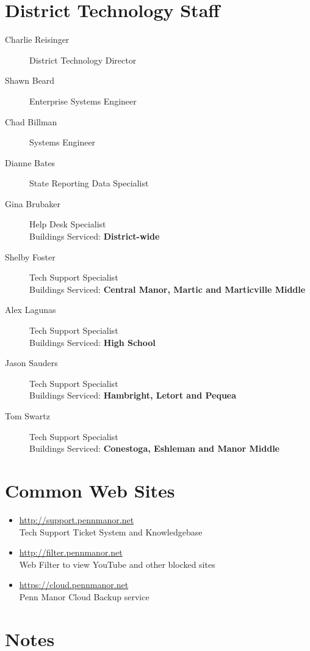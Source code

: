 \documentclass[10pt,foldmark,notumble]{leaflet}
\begin{document}
\section{District Technology Staff\color{red}\hrulefill\color{black}}

\begin{description}
\item[Charlie Reisinger] \dotfill District Technology Director
\item[Shawn Beard] \dotfill Enterprise Systems Engineer
\item[Chad Billman] \dotfill Systems Engineer
\item[Dianne Bates] \dotfill State Reporting Data Specialist
\item[Gina Brubaker] \dotfill Help Desk Specialist\\{\scriptsize Buildings Serviced: \hfill \textbf{\color{red}District-wide}\color{black}}
\item[Shelby Foster] \dotfill Tech Support Specialist\\{\scriptsize Buildings Serviced: \hfill \textbf{\color{red}Central Manor, Martic and Marticville Middle}\color{black}}
\item[Alex Lagunas] \dotfill Tech Support Specialist\\{\scriptsize Buildings Serviced: \hfill \textbf{\color{red}High School}\color{black}}
\item[Jason Sauders] \dotfill Tech Support Specialist\\{\scriptsize Buildings Serviced: \hfill \textbf{\color{red}Hambright, Letort and Pequea}\color{black}}
\item[Tom Swartz] \dotfill Tech Support Specialist\\{\scriptsize Buildings Serviced: \hfill \textbf{\color{red}Conestoga, Eshleman and Manor Middle}\color{black}}
\end{description}


\section{Common Web Sites\color{red}\hrulefill\color{black}}
\begin{itemize}
\item \url{http://support.pennmanor.net}\\Tech Support Ticket System and Knowledgebase
\item \url{http://filter.pennmanor.net}\\Web Filter to view YouTube and other blocked sites
\item \url{https://cloud.pennmanor.net}\\Penn Manor Cloud Backup service
\end{itemize}

\section{Notes\color{red}\hrulefill\color{black}}
\end{document}
